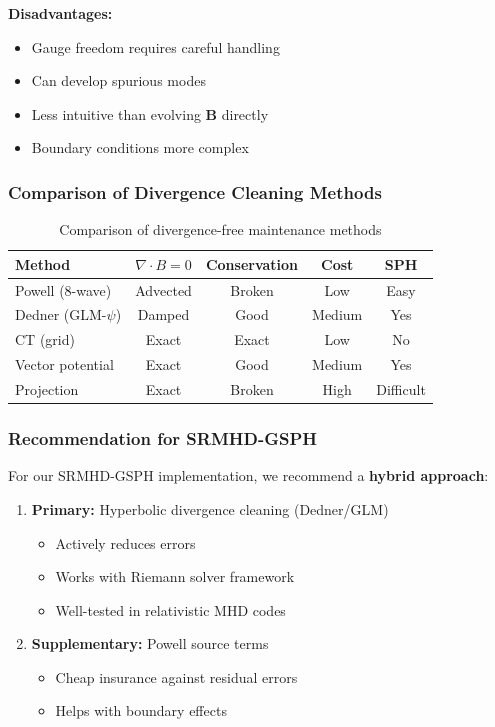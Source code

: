 \documentclass[12pt,a4paper]{article}
\begin{document}
\textbf{Disadvantages:}
\begin{itemize}
    \item Gauge freedom requires careful handling
    \item Can develop spurious modes
    \item Less intuitive than evolving $\bm{B}$ directly
    \item Boundary conditions more complex
\end{itemize}

\subsubsection{Comparison of Divergence Cleaning Methods}

\begin{table}[h]
\centering
\begin{tabular}{|l|c|c|c|c|}
\hline
\textbf{Method} & \textbf{$\nabla \cdot B = 0$} & \textbf{Conservation} & \textbf{Cost} & \textbf{SPH} \\
\hline
Powell (8-wave) & Advected & Broken & Low & Easy \\
\hline
Dedner (GLM-$\psi$) & Damped & Good & Medium & Yes \\
\hline
CT (grid) & Exact & Exact & Low & No \\
\hline
Vector potential & Exact & Good & Medium & Yes \\
\hline
Projection & Exact & Broken & High & Difficult \\
\hline
\end{tabular}
\caption{Comparison of divergence-free maintenance methods}
\label{tab:divB_methods}
\end{table}

\subsubsection{Recommendation for SRMHD-GSPH}

For our SRMHD-GSPH implementation, we recommend a \textbf{hybrid approach}:

\begin{enumerate}
    \item \textbf{Primary:} Hyperbolic divergence cleaning (Dedner/GLM)
        \begin{itemize}
            \item Actively reduces errors
            \item Works with Riemann solver framework
            \item Well-tested in relativistic MHD codes
        \end{itemize}

    \item \textbf{Supplementary:} Powell source terms
        \begin{itemize}
            \item Cheap insurance against residual errors
            \item Helps with boundary effects
        \end{itemize}
\end{enumerate}
\end{document}
